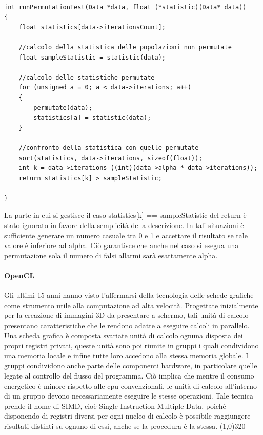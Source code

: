 \begin{lstlisting}[style=CStyle]

int runPermutationTest(Data *data, float (*statistic)(Data* data))
{
	float statistics[data->iterationsCount];
	
	//calcolo della statistica delle popolazioni non permutate
	float sampleStatistic = statistic(data); 	
	
	//calcolo delle statistiche permutate
	for (unsigned a = 0; a < data->iterations; a++)
	{
		permutate(data);
		statistics[a] = statistic(data);
	}
	
	//confronto della statistica con quelle permutate
	sort(statistics, data->iterations, sizeof(float));
	int k = data->iterations-((int)(data->alpha * data->iterations));	
	return statistics[k] > sampleStatistic;
	
}
\end{lstlisting}

La parte in cui si gestisce il caso statistics[k] == sampleStatistic del return è stato ignorato in favore della semplicità della descrizione. In tali situazioni è sufficiente generare un numero casuale tra 0 e 1 e accettare il risultato se tale valore è inferiore ad alpha. Ciò garantisce che anche nel caso si esegua una permutazione sola il numero di falsi allarmi sarà esattamente alpha.


\paragraph{OpenCL}

Gli ultimi 15 anni hanno visto l'affermarsi della tecnologia delle schede grafiche come strumento utile alla computazione ad alta velocità.
Progettate inizialmente per la creazione di immagini 3D da presentare a schermo, tali unità di calcolo presentano caratteristiche che le rendono adatte a eseguire calcoli in parallelo.
Una scheda grafica è composta svariate unità di calcolo ognuna disposta dei propri registri privati, queste unità sono poi riunite in gruppi i quali condividono una memoria locale e infine tutte loro accedono alla stessa memoria globale. 
I gruppi condividono anche parte delle componenti hardware, in particolare quelle legate al controllo del flusso del programma. Ciò implica che mentre il consumo energetico è minore rispetto alle cpu convenzionali, le unità di calcolo all'interno di un gruppo devono necessariamente eseguire le stesse operazioni. Tale tecnica prende il nome di SIMD, cioè Single Instruction Multiple Data, poiché disponendo di registri diversi per ogni nucleo di calcolo è possibile raggiungere risultati distinti su ognuno di essi, anche se la procedura è la stessa.
\line(1,0){320}


